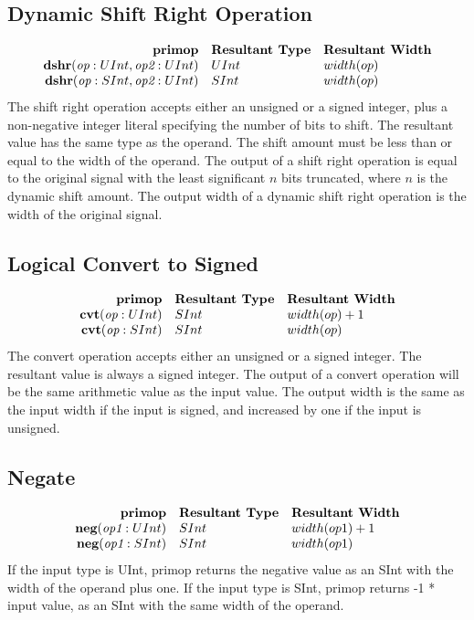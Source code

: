 \documentclass[12pt]{article}
\begin{document}
\subsection{Dynamic Shift Right Operation}
\[
\begin{array}{rll}
\text{\bf primop} & \text{\bf Resultant Type} & \text{\bf Resultant Width} \\
\text{\bf dshr}(\text{\em op}:UInt, \text{\em op2}:UInt)  & UInt & width(op) \\
\text{\bf dshr}(\text{\em op}:SInt, \text{\em op2}:UInt)  & SInt & width(op) \\
\end{array}
\]
The shift right operation accepts either an unsigned or a signed integer, plus a non-negative integer literal specifying the number of bits to shift.
The resultant value has the same type as the operand.
The shift amount must be less than or equal to the width of the operand.
The output of a shift right operation is equal to the original signal with the least significant $n$ bits truncated, where $n$ is the dynamic shift amount.
The output width of a dynamic shift right operation is the width of the original signal.

\subsection{Logical Convert to Signed}
\[
\begin{array}{rll}
\text{\bf primop} & \text{\bf Resultant Type} & \text{\bf Resultant Width} \\
\text{\bf cvt}(\text{\em op}:UInt)      & SInt & width(op) + 1 \\
\text{\bf cvt}(\text{\em op}:SInt)      & SInt & width(op) \\
\end{array}
\]
The convert operation accepts either an unsigned or a signed integer.
The resultant value is always a signed integer.
The output of a convert operation will be the same arithmetic value as the input value.
The output width is the same as the input width if the input is signed, and increased by one if the input is unsigned.

\subsection{Negate}
\[
\begin{array}{rll}
\text{\bf primop} & \text{\bf Resultant Type} & \text{\bf Resultant Width} \\
\text{\bf neg}(\text{\em op1}:UInt)       & SInt & width(op1) + 1 \\
\text{\bf neg}(\text{\em op1}:SInt)       & SInt & width(op1) \\
\end{array}
\]
If the input type is UInt, primop returns the negative value as an SInt with the width of the operand plus one.
If the input type is SInt, primop returns -1 * input value, as an SInt with the same width of the operand.
\end{document}
